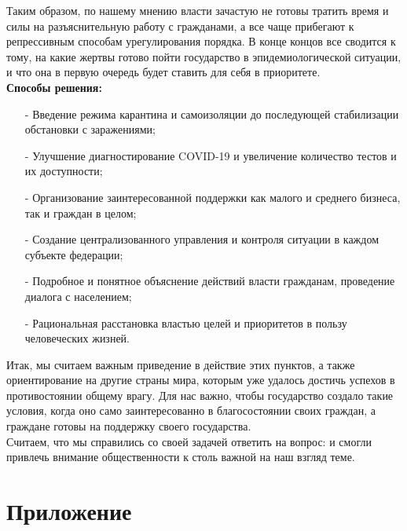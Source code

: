 \documentclass[a4paper, 12pt]{extarticle}
\begin{document}
Таким образом, по нашему мнению власти зачастую не готовы тратить время и силы
на разъяснительную работу с гражданами, а все чаще прибегают к репрессивным
способам урегулирования порядка. В конце концов все сводится к тому, на какие
жертвы готово пойти государство в эпидемиологической ситуации, и что она в
первую очередь будет ставить для себя в приоритете.
\\

\textbf{Способы решения:}
\begin{itemize}
    \item[-] Введение режима карантина и самоизоляции до последующей стабилизации
        обстановки с заражениями;
    \item[-] Улучшение диагностирование COVID-19 и увеличение количество
        тестов и их доступности;
    \item[-] Организование заинтересованной поддержки как малого и среднего бизнеса, так и
        граждан в целом;
    \item[-] Создание централизованного управления и контроля ситуации в каждом
        субъекте федерации;
    \item[-] Подробное и понятное объяснение действий власти гражданам,
        проведение диалога с населением;
    \item[-] Рациональная расстановка властью целей и приоритетов в пользу человеческих
        жизней.
\end{itemize}

Итак, мы считаем важным приведение в действие этих пунктов, а также
ориентирование на другие страны мира, которым уже удалось достичь успехов в
противостоянии общему врагу. Для нас важно, чтобы государство создало такие
условия, когда оно само заинтересованно в благосостоянии своих граждан, а
граждане готовы на поддержку своего государства.
\\

Считаем, что мы справились со своей задачей ответить на вопрос:  и
смогли привлечь внимание общественности к столь важной на наш взгляд теме.

\newpage
\section{Приложение}
\newpage

{}

\end{document}
